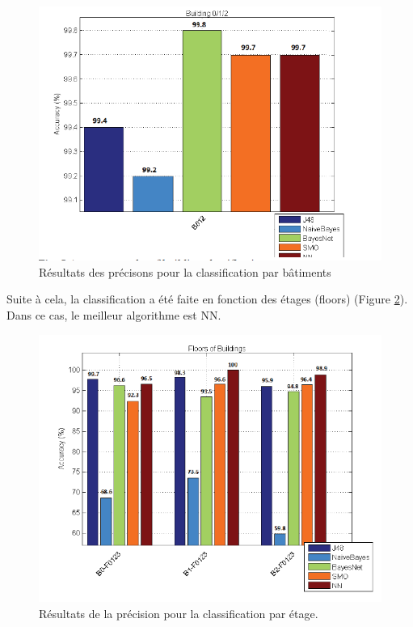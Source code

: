\begin{figure}[htp]
	\begin{center}
		\includegraphics[scale=0.6]{figures/bluildingClassification.png}
		\caption{Résultats des précisons pour la classification par bâtiments \cite{ML_algo}}
		\label{fig:builClass} %
	\end{center}
\end{figure}

Suite à cela, la classification a été faite en fonction des étages (floors) (Figure \ref{fig:floorClass}). Dans ce cas, le meilleur algorithme est NN. 

\begin{figure}[htp]
	\begin{center}
		\includegraphics[scale=0.6]{figures/floorClassification.png}
		\caption{Résultats de la précision pour la classification par étage.\cite{ML_algo}}
		\label{fig:floorClass} %
	\end{center}
\end{figure}


